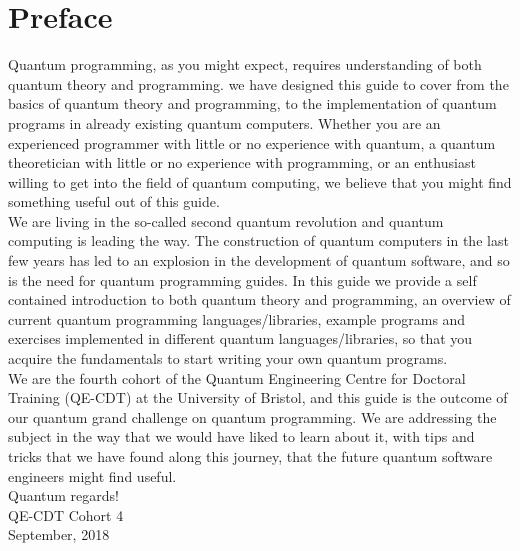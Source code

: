 \chapter*{Preface}


Quantum programming, as you might expect, requires understanding of both quantum theory and programming. we have designed this guide to cover from the basics of quantum theory and programming, to the implementation of quantum programs in already existing quantum computers. Whether you are an experienced programmer with little or no experience with quantum, a quantum theoretician with little or no experience with programming, or an enthusiast willing to get into the field of quantum computing, we believe that you might find something useful out of this guide.\\ 

\noindent
We are living in the so-called second quantum revolution and quantum computing is leading the way. The construction of quantum computers in the last few years has led to an explosion in the development of quantum software, and so is the need for quantum programming guides. In this guide we provide a self contained introduction to both quantum theory and programming, an overview of current quantum programming languages/libraries, example programs and exercises implemented in different quantum languages/libraries, so that you acquire the fundamentals to start writing your own quantum programs.\\

\noindent
We are the fourth cohort of the Quantum Engineering Centre for Doctoral Training (QE-CDT) at the University of Bristol, and this guide is the outcome of our quantum grand challenge on quantum programming. We are addressing the subject in the way that we would have liked to learn about it, with tips and tricks that we have found along this journey, that the future quantum software engineers might find useful.\\

\noindent
Quantum regards!\\

\noindent
QE-CDT Cohort 4\\

\noindent
September, 2018

